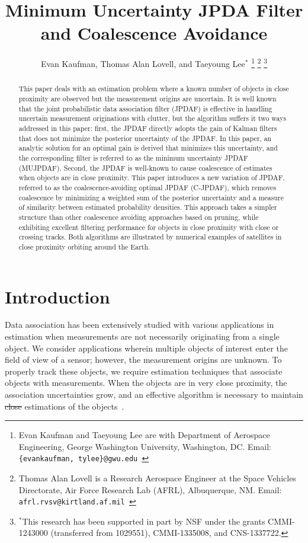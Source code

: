 \documentclass[letterpaper, 10pt, conference]{ieeeconf}
\title{\LARGE \bf
Minimum Uncertainty JPDA Filter and Coalescence Avoidance}
\author{Evan Kaufman, Thomas Alan Lovell, and Taeyoung Lee$^*$
 \thanks{Evan Kaufman and Taeyoung Lee are with Department of Aerospace Engineering, George Washington University, Washington, DC. Email: {\tt\footnotesize \{evankaufman, tylee\}@gwu.edu }}
\thanks{Thomas Alan Lovell is a Research Aerospace Engineer at the Space Vehicles Directorate, Air Force Research Lab (AFRL), Albuquerque, NM. Email: {\tt\footnotesize afrl.rvsv@kirtland.af.mil }}
\thanks{$^*$This research has been supported in part by NSF under the grants CMMI-1243000 (transferred from 1029551), CMMI-1335008, and CNS-1337722.}}
\providecommand{\DIFadd}[1]{{\protect\color{blue}\uwave{#1}}} %
\providecommand{\DIFdel}[1]{{\protect\color{red}\sout{#1}}}                      %
\providecommand{\DIFaddbegin}{} %
\providecommand{\DIFaddend}{} %
\providecommand{\DIFdelbegin}{} %
\providecommand{\DIFdelend}{} %
\begin{document}
\allowdisplaybreaks


\maketitle \thispagestyle{empty} \pagestyle{empty}

\begin{abstract}
This paper deals with an estimation problem where a known number of objects in close proximity are observed but the measurement origins are uncertain.
It is well known that the joint probabilistic data association filter (JPDAF) is effective in handling uncertain measurement originations with clutter, but the algorithm suffers it two ways addressed in this paper: first, the JPDAF directly adopts the gain of Kalman filters that does not minimize the posterior uncertainty of the JPDAF.
In this paper, an analytic solution for an optimal gain is derived that minimizes this uncertainty, and the corresponding filter is referred to as the minimum uncertainty JPDAF (MUJPDAF).
Second, the JPDAF is well-known to cause coalescence of estimates when objects are in close proximity.
This paper introduces a new variation of JPDAF, referred to as the coalescence-avoiding optimal JPDAF (C-JPDAF), which removes coalescence by minimizing a weighted sum of the posterior uncertainty and a measure of similarity between estimated probability densities.
This approach takes a simpler structure than other coalescence avoiding approaches based on pruning, while exhibiting excellent filtering performance for objects in close proximity with close or crossing tracks. Both algorithms are illustrated by numerical examples of satellites in close proximity orbiting around the Earth.
\end{abstract}


\section{Introduction}

Data association has been extensively studied with various applications in estimation when measurements are not necessarily originating from a single object.
We consider applications wherein multiple objects of interest enter the field of view of a sensor; however, the measurement origins are unknown.
To properly track these objects, we require estimation techniques that associate objects with measurements.
When the objects are in very close proximity, the association uncertainties grow, and an effective algorithm is necessary to maintain \DIFdelbegin \DIFdel{close }\DIFdelend \DIFaddbegin \DIFadd{accurate }\DIFaddend estimations of the objects~\cite{KauLovLee14}.
\end{document}
